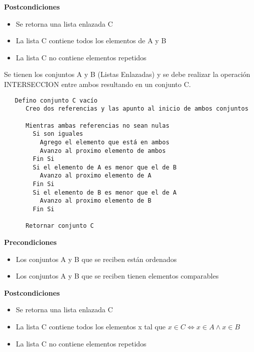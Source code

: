 \documentclass[12pt,letterpaper, onecolumn]{exam}
\begin{document}
\begin{questions}
\begin{solution}
      \vspace{-3mm}

      \textbf{Postcondiciones}
      \vspace{-4mm}
      \begin{itemize}
        \item Se retorna una lista enlazada C
      \vspace{-2mm}
    \item La lista C contiene todos los elementos de A y B 
      \vspace{-2mm}
    \item La lista C no contiene elementos repetidos 
      \end{itemize}

Se tienen los conjuntos A y B (Listas Enlazadas) y se debe realizar la operación INTERSECCION entre ambos resultando en un conjunto C.
 \begin{verbatim}
   Defino conjunto C vacío 
      Creo dos referencias y las apunto al inicio de ambos conjuntos 

      Mientras ambas referencias no sean nulas
        Si son iguales
          Agrego el elemento que está en ambos
          Avanzo al proximo elemento de ambos 
        Fin Si
        Si el elemento de A es menor que el de B
          Avanzo al proximo elemento de A
        Fin Si
        Si el elemento de B es menor que el de A
          Avanzo al proximo elemento de B
        Fin Si
        
      Retornar conjunto C
 \end{verbatim}
\textbf{Precondiciones}
      \vspace{-4mm}
      \begin{itemize}
        \item Los conjuntos A y B que se reciben están ordenados
      \vspace{-2mm}
        \item Los conjuntos A y B que se reciben tienen elementos comparables 
      \end{itemize}

      \vspace{-3mm}

      \textbf{Postcondiciones}
      \vspace{-4mm}
      \begin{itemize}
        \item Se retorna una lista enlazada C
      \vspace{-2mm}
    \item La lista C contiene todos los elementos x tal que $x \in C \iff x \in A \wedge x \in B $
      \vspace{-2mm}
    \item La lista C no contiene elementos repetidos 
      \end{itemize}


\end{solution}
\end{questions}
\end{document}
